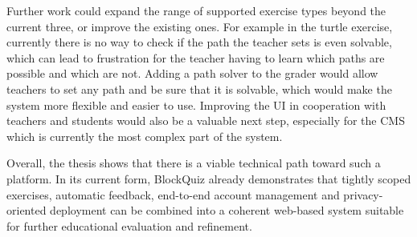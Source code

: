 Further work could expand the range of supported exercise types beyond the current three, or improve the existing ones. 
For example in the turtle exercise, currently there is no way to check if the path the teacher sets is even solvable, 
which can lead to frustration for the teacher having to learn which paths are possible and which are not. 
Adding a path solver to the grader would allow teachers to set any path and be sure that it is solvable, 
which would make the system more flexible and easier to use. Improving the UI in cooperation with teachers and students 
would also be a valuable next step, especially for the CMS which is currently the most complex part of the system.

Overall, the thesis shows that there is a viable technical path toward such a platform. 
In its current form, BlockQuiz already demonstrates that tightly scoped exercises, automatic feedback, end-to-end account 
management and privacy-oriented deployment can be combined into a coherent web-based system suitable for further
educational evaluation and refinement.
